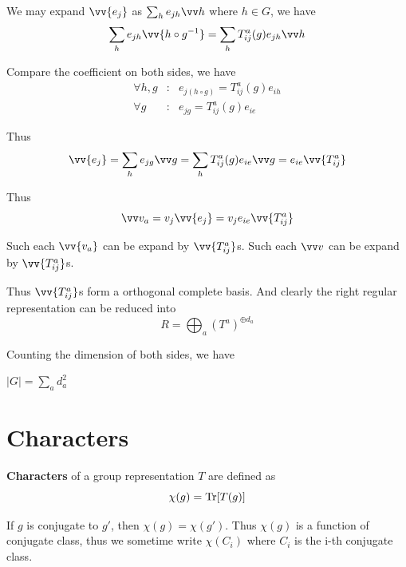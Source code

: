\documentclass[12pt]{book}
\begin{document}
\begin{example}
	We may expand $\vv{e_j} $ as $\sum_he_{jh}\vv h$ where $h\in G$, we have
	\begin{equation}
		\sum_he_{jh}\vv{h\circ g^{-1}}=\sum_hT^a_{ij}(g)e_{jh}\vv h
	\end{equation}
	
	Compare the coefficient on both sides, we have
	\begin{eqnarray}
		\forall h,g&:&e _{j(h\circ g)}=T^a_{ij}(g)e_{ih}\\
		\forall g&:&e _{jg}=T^a_{ij}(g)e_{ie}
	\end{eqnarray}
	
	Thus
	\begin{equation}
		\vv{e_j}=\sum_he_{jg}\vv g=\sum_hT^a_{ij}(g)e_{ie}\vv g=e_{ie}\vv{T^a_{ij}}
	\end{equation}
	
	Thus
	\begin{equation}
		\vv v_a=v_j\vv{e_j}=v_je_{ie}\vv{T^a_{ij}}
	\end{equation}
	
	Such each $\vv {v_a}$ can be expand by $\vv{T^a_{ij}}$s. Such each $\vv v$ can be expand by $\vv{T^a_{ij}}$s.
	
	Thus $\vv{T^a_{ij}}$s form a orthogonal complete basis. And clearly the right regular representation can be reduced into
	\begin{equation}
		R=\bigoplus_a(T^a)^{\oplus d_a}
	\end{equation}
	\end{example}
	
	Counting the dimension of both sides, we have 
	\begin{theorem}[Burnside]
		$|G|=\sum_ad_a^2$
	\end{theorem}
	
	\section{Characters}
	
	\begin{definition}
		
	\textbf{Characters} of a group representation $T$ are defined as	
	\begin{equation}
		\chi(g)={\rm Tr}[T(g)]
	\end{equation}
	\end{definition}
	
	\begin{lemma}
		If $g$ is conjugate to $g'$, then $\chi(g)=\chi(g')$. Thus $\chi(g)$ is a function of conjugate class, thus we sometime write 
	$\chi(C_i)$ where $C_i$ is the i-th conjugate class.
	\end{lemma}
	
\end{document}
